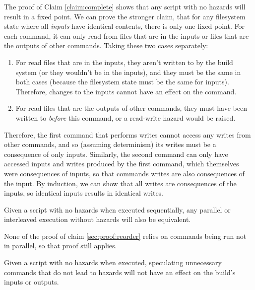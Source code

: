 \proof The proof of Claim \ref{claim:complete} shows that any script with no hazards will result in a fixed point. We can prove the stronger claim, that for any filesystem state where all \emph{inputs} have identical contents, there is only one fixed point. For each command, it can only read from files that are in the inputs or files that are the outputs of other commands. Taking these two cases separately:

\begin{enumerate}
\item For read files that are in the inputs, they aren't written to by the build system (or they wouldn't be in the inputs), and they must be the same in both cases (because the filesystem state must be the same for inputs). Therefore, changes to the inputs cannot have an effect on the command.
\item For read files that are the outputs of other commands, they must have been written to \emph{before} this command, or a read-write hazard would be raised.
\end{enumerate}

Therefore, the first command that performs writes cannot access any writes from other commands, and so (assuming determinism) its writes must be a consequence of only inputs. Similarly, the second command can only have accessed inputs and writes produced by the first command, which themselves were consequences of inputs, so that commands writes are also consequences of the input. By induction, we can show that all writes are consequences of the inputs, so identical inputs results in identical writes.

\begin{claim}
\label{sec:proof:parallel}

Given a script with no hazards when executed sequentially, any parallel or interleaved execution without hazards will also be equivalent.
\end{claim}

\proof None of the proof of claim \ref{sec:proof:reorder} relies on commands being run not in parallel, so that proof still applies.

\begin{claim}
\label{sec:proof:additional}

 Given a script with no hazards when executed, speculating unnecessary commands that do not lead to hazards will not have an effect on the build's inputs or outputs.
\end{claim}

